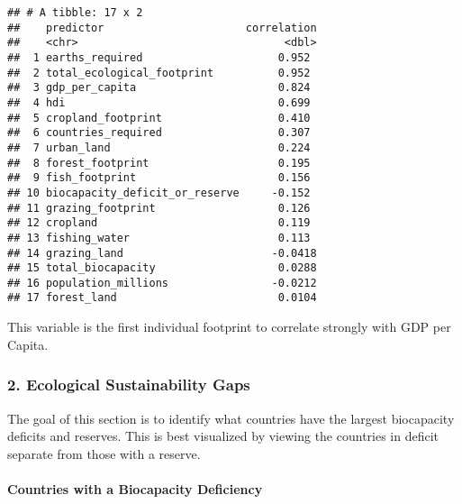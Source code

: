 \documentclass[
]{article}
\begin{document}
\begin{verbatim}
## # A tibble: 17 x 2
##    predictor                      correlation
##    <chr>                                <dbl>
##  1 earths_required                     0.952 
##  2 total_ecological_footprint          0.952 
##  3 gdp_per_capita                      0.824 
##  4 hdi                                 0.699 
##  5 cropland_footprint                  0.410 
##  6 countries_required                  0.307 
##  7 urban_land                          0.224 
##  8 forest_footprint                    0.195 
##  9 fish_footprint                      0.156 
## 10 biocapacity_deficit_or_reserve     -0.152 
## 11 grazing_footprint                   0.126 
## 12 cropland                            0.119 
## 13 fishing_water                       0.113 
## 14 grazing_land                       -0.0418
## 15 total_biocapacity                   0.0288
## 16 population_millions                -0.0212
## 17 forest_land                         0.0104
\end{verbatim}

This variable is the first individual footprint to correlate strongly
with GDP per Capita.

\subsubsection{2. Ecological Sustainability
Gaps}\label{ecological-sustainability-gaps}

The goal of this section is to identify what countries have the largest
biocapacity deficits and reserves. This is best visualized by viewing
the countries in deficit separate from those with a reserve.

\paragraph{Countries with a Biocapacity
Deficiency}\label{countries-with-a-biocapacity-deficiency}
\end{document}
